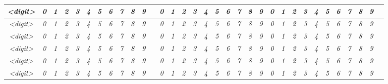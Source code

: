 \documentclass[10pt,a1paper]{memoir}
\begin{document}
\begin{center}
\begin{tabular}{ |c||c|c|c|c|c|c|c|c|c|c|c|c|c|c|c|c|c|c|c|c|c|c|c|c|c|c|c|c|c|c|c|c| }
\textsl{\textless digit\textgreater} & \textit{0} & \textit{1} & \textit{2} & \textit{3} & \textit{4} & \textit{5} & \textit{6} & \textit{7} & \textit{8} & \textit{9} &  & \textit{0} & \textit{1} & \textit{2} & \textit{3} & \textit{4} & \textit{5} & \textit{6} & \textit{7} & \textit{8} & \textit{9} & \textit{0} & \textit{1} & \textit{2} & \textit{3} & \textit{4} & \textit{5} & \textit{6} & \textit{7} & \textit{8} & \textit{9} & \\ \hline
\textsl{\textless digit\textgreater} & \textit{0} & \textit{1} & \textit{2} & \textit{3} & \textit{4} & \textit{5} & \textit{6} & \textit{7} & \textit{8} & \textit{9} &  & \textit{0} & \textit{1} & \textit{2} & \textit{3} & \textit{4} & \textit{5} & \textit{6} & \textit{7} & \textit{8} & \textit{9} & \textit{0} & \textit{1} & \textit{2} & \textit{3} & \textit{4} & \textit{5} & \textit{6} & \textit{7} & \textit{8} & \textit{9} & \\ \hline
\textsl{\textless digit\textgreater} & \textit{0} & \textit{1} & \textit{2} & \textit{3} & \textit{4} & \textit{5} & \textit{6} & \textit{7} & \textit{8} & \textit{9} &  & \textit{0} & \textit{1} & \textit{2} & \textit{3} & \textit{4} & \textit{5} & \textit{6} & \textit{7} & \textit{8} & \textit{9} & \textit{0} & \textit{1} & \textit{2} & \textit{3} & \textit{4} & \textit{5} & \textit{6} & \textit{7} & \textit{8} & \textit{9} & \\ \hline
\textsl{\textless digit\textgreater} & \textit{0} & \textit{1} & \textit{2} & \textit{3} & \textit{4} & \textit{5} & \textit{6} & \textit{7} & \textit{8} & \textit{9} &  & \textit{0} & \textit{1} & \textit{2} & \textit{3} & \textit{4} & \textit{5} & \textit{6} & \textit{7} & \textit{8} & \textit{9} & \textit{0} & \textit{1} & \textit{2} & \textit{3} & \textit{4} & \textit{5} & \textit{6} & \textit{7} & \textit{8} & \textit{9} & \\ \hline
\textsl{\textless digit\textgreater} & \textit{0} & \textit{1} & \textit{2} & \textit{3} & \textit{4} & \textit{5} & \textit{6} & \textit{7} & \textit{8} & \textit{9} &  & \textit{0} & \textit{1} & \textit{2} & \textit{3} & \textit{4} & \textit{5} & \textit{6} & \textit{7} & \textit{8} & \textit{9} & \textit{0} & \textit{1} & \textit{2} & \textit{3} & \textit{4} & \textit{5} & \textit{6} & \textit{7} & \textit{8} & \textit{9} & \\ \hline
\textsl{\textless digit\textgreater} & \textit{0} & \textit{1} & \textit{2} & \textit{3} & \textit{4} & \textit{5} & \textit{6} & \textit{7} & \textit{8} & \textit{9} &  & \textit{0} & \textit{1} & \textit{2} & \textit{3} & \textit{4} & \textit{5} & \textit{6} & \textit{7} & \textit{8} & \textit{9} & \textit{0} & \textit{1} & \textit{2} & \textit{3} & \textit{4} & \textit{5} & \textit{6} & \textit{7} & \textit{8} & \textit{9} & \\ \hline

\end{tabular}
\end{center}
\end{document}
